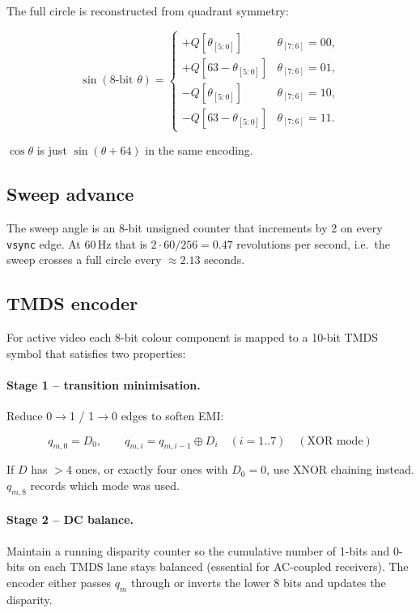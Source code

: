 \documentclass[11pt,a4paper]{article}
\begin{document}
The full circle is reconstructed from quadrant symmetry:

\[
\sin(8\text{-bit }\theta) = \begin{cases}
  +Q[\theta_{[5:0]}]      & \theta_{[7:6]} = 00,\\
  +Q[63 - \theta_{[5:0]}] & \theta_{[7:6]} = 01,\\
  -Q[\theta_{[5:0]}]      & \theta_{[7:6]} = 10,\\
  -Q[63 - \theta_{[5:0]}] & \theta_{[7:6]} = 11.
\end{cases}
\]

$\cos\theta$ is just $\sin(\theta + 64)$ in the same encoding.

\subsection{Sweep advance}

The sweep angle is an 8-bit unsigned counter that increments by 2 on
every \texttt{vsync} edge.  At 60\,Hz that is
$2 \cdot 60 / 256 = 0.47$ revolutions per second, i.e.\ the sweep
crosses a full circle every $\approx 2.13$ seconds.

\subsection{TMDS encoder}

For active video each 8-bit colour component is mapped to a 10-bit TMDS
symbol that satisfies two properties:

\paragraph{Stage 1 -- transition minimisation.}  Reduce 0$\to$1 / 1$\to$0
edges to soften EMI:

\[
  q_{m,0} = D_0,\qquad
  q_{m,i} = q_{m,i-1} \oplus D_i \quad (i=1..7)\quad (\text{XOR mode})
\]

If $D$ has $> 4$ ones, or exactly four ones with $D_0=0$, use XNOR
chaining instead.  $q_{m,8}$ records which mode was used.

\paragraph{Stage 2 -- DC balance.}  Maintain a running disparity
counter so the cumulative number of 1-bits and 0-bits on each TMDS lane
stays balanced (essential for AC-coupled receivers).  The encoder
either passes $q_m$ through or inverts the lower 8 bits and updates the
disparity.
\end{document}

